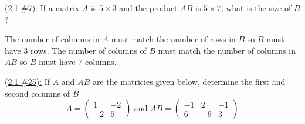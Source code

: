 \documentclass{exam}
\begin{document}
\underline{(2.1 \#7):} If a matrix $A$ is $5 \times 3$ and the product $AB$ is $5 \times 7$, what is the size of $B$?
\begin{solution}
    The number of columns in $A$ must match the number of rows in $B$ so $B$ must have $3$ rows. The number of columns of $B$ must match the number of columns in $AB$ so $B$ must have $7$ columns.\ 
\end{solution}


\underline{(2.1 \#25):} If $A$ and $AB$ are the matricies given below, determine the first and second columns of $B$
\[
    A = \begin{pmatrix}
        1 & -2 \\ -2 & 5
    \end{pmatrix}
    \text{ and } 
    AB = \begin{pmatrix}
        -1 & 2 & -1 \\
        6 & -9 & 3
    \end{pmatrix}
\]
\end{document}
